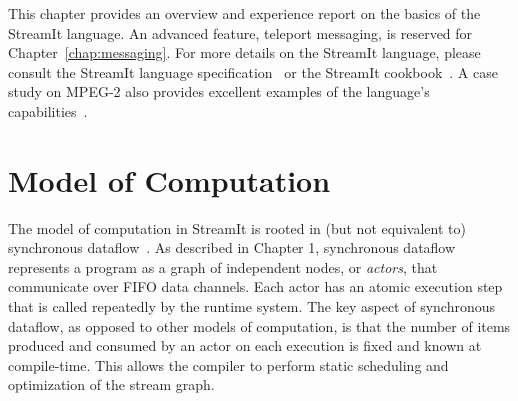 \label{chap:language}

This chapter provides an overview and experience report on the basics
of the StreamIt language.  An advanced feature, teleport messaging, is
reserved for Chapter~\ref{chap:messaging}.  For more details on
the StreamIt language, please consult the StreamIt language
specification~\cite{streamit-lang-spec} or the StreamIt
cookbook~\cite{streamit-cookbook}.  A case study on MPEG-2 also
provides excellent examples of the language's
capabilities~\cite{drake-ipdps06}.

\section{Model of Computation}

The model of computation in StreamIt is rooted in (but not equivalent
to) synchronous dataflow~\cite{lee_static_1987}.  As described in
Chapter 1, synchronous dataflow represents a program as a graph of
independent nodes, or {\it actors}, that communicate over FIFO data
channels.  Each actor has an atomic execution step that is called
repeatedly by the runtime system.  The key aspect of synchronous
dataflow, as opposed to other models of computation, is that the
number of items produced and consumed by an actor on each execution is
fixed and known at compile-time.  This allows the compiler to perform
static scheduling and optimization of the stream graph.

